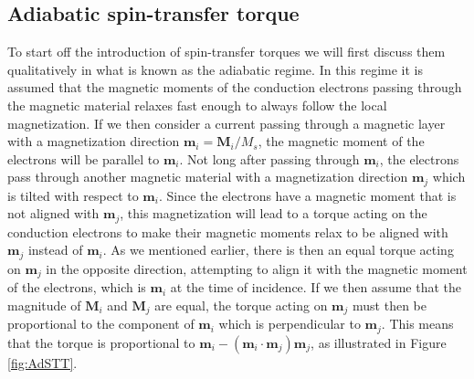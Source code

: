 \subsection{Adiabatic spin-transfer torque} \label{sec:AdSTT}
To start off the introduction of spin-transfer torques we will first discuss them qualitatively in what is known as the adiabatic regime. In this regime it is assumed that the magnetic moments of the conduction electrons passing through the magnetic material relaxes fast enough to always follow the local magnetization. If we then consider a current passing through a magnetic layer with a magnetization direction $\mathbold{m}_i = \mathbold{M}_i/M_s$, the magnetic moment of the electrons will be parallel to $\mathbold{m}_i$. Not long after passing through $\mathbold{m}_i$, the electrons pass through another magnetic material with a magnetization direction $\mathbold{m}_j$ which is tilted with respect to $\mathbold{m}_i$. Since the electrons have a magnetic moment that is not aligned with $\mathbold{m}_j$, this magnetization will lead to a torque acting on the conduction electrons to make their magnetic moments relax to be aligned with $\mathbold{m}_j$ instead of $\mathbold{m}_i$. As we mentioned earlier, there is then an equal torque acting on $\mathbold{m}_j$ in the opposite direction, attempting to align it with the magnetic moment of the electrons, which is $\mathbold{m}_i$ at the time of incidence. If we then assume that the magnitude of $\mathbold{M}_i$ and $\mathbold{M}_j$ are equal, the torque acting on $\mathbold{m}_j$ must then be proportional to the component of $\mathbold{m}_i$ which is perpendicular to $\mathbold{m}_j$. This means that the torque is proportional to $\mathbold{m}_i-(\mathbold{m}_i\cdot\mathbold{m}_j)\mathbold{m}_j$, as illustrated in Figure \ref{fig:AdSTT}.

